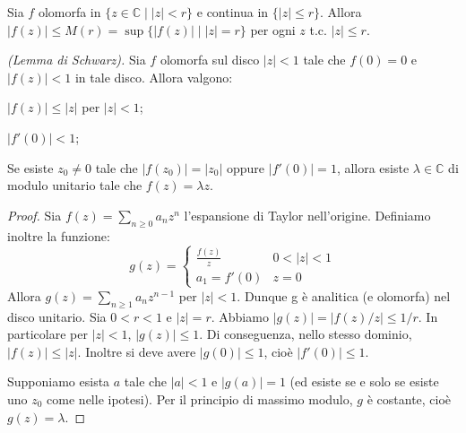 \begin{oss}
  Sia $f$ olomorfa in $\{z \in \mathbb{C} \mid |z| <r\}$ e continua in $\{|z| \le r\}$. Allora $|f(z)| \le M(r)=\sup\{|f(z)| \mid |z|=r\}$ per ogni $z$ t.c. $|z| \le r$.
\end{oss}

\begin{thm} \emph{(Lemma di Schwarz).}
    Sia $f$ olomorfa sul disco $|z|<1$ tale che $f(0)=0$ e $|f(z)|<1$ in tale
    disco. Allora valgono:
    \begin{nlist}
        \item $|f(z)|\leq |z|$ per $|z|<1$;
        \item $|f'(0)|<1$;
        \item Se esiste $z_0\neq 0$ tale che $|f(z_0)|=|z_0|$ oppure
            $|f'(0)|=1$, allora esiste $\lambda\in\mathbb{C}$ di modulo unitario
            tale che $f(z)=\lambda z$.
    \end{nlist}
\end{thm}
\begin{proof}
    Sia $f(z)=\sum_{n\geq 0} a_n z^n$ l'espansione di Taylor nell'origine.
    Definiamo inoltre la funzione:
    \[
        g(z)=
        \begin{cases}
            \frac{f(z)}{z} & 0<|z|<1 \\
            a_1=f'(0) & z=0
        \end{cases}
    \]
    Allora $g(z)=\sum_{n\geq 1}a_n z^{n-1}$ per $|z|<1$. Dunque g \`e analitica
    (e olomorfa) nel disco unitario. Sia $0<r<1$ e $|z|=r$. Abbiamo $|g(z)| =
    |f(z)/z|\leq 1/r$. In particolare per $|z|<1$, $|g(z)|\leq 1$. Di
    conseguenza, nello stesso dominio, $|f(z)|\leq |z|$. Inoltre si deve avere
    $|g(0)|\leq 1$, cio\`e $|f'(0)|\leq 1$.

    Supponiamo esista $a$ tale che $|a|<1$ e $|g(a)|=1$ (ed esiste se e solo se
    esiste uno $z_0$ come nelle ipotesi). Per il principio di massimo modulo,
    $g$ \`e costante, cio\`e $g(z) = \lambda$.
\end{proof}


